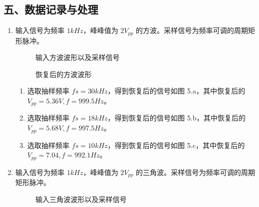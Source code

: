 \documentclass[dvipsnames, svgnames,a4paper,11pt]{article}
\begin{document}
\subsection*{五、数据记录与处理}
  \begin{enumerate}
    \item 输入信号为频率 $1kHz$，峰峰值为 $2V_{pp}$ 的方波。采样信号为频率可调的周期矩形脉冲。
      \begin{figure}[htbp]
        \centering
        \caption{输入方波波形以及采样信号}
      \end{figure}
      \begin{figure}[htbp]
        \centering

        \caption{恢复后的方波波形}
      \end{figure}
      
      \begin{enumerate}
        \item 选取抽样频率 $fs = 30kHz$，得到恢复后的信号如图 5.a，其中恢复后的 $V_{pp} = 5.36V,f = 999.5Hz$。
        \item 选取抽样频率 $fs = 18kHz$，得到恢复后的信号如图 5.b，其中恢复后的 $V_{pp} = 5.68V,f = 997.5Hz$。
        \item 选取抽样频率 $fs = 10kHz$，得到恢复后的信号如图 5.c，其中恢复后的 $V_{pp} = 7.04,f = 992.1Hz$。
      \end{enumerate}


    \newpage
    \item 输入信号为频率 $1kHz$，峰峰值为 $2V_{pp}$ 的三角波。采样信号为频率可调的周期矩形脉冲。
      \begin{figure}[htbp]
        \centering
        \caption{输入三角波波形以及采样信号}
      \end{figure}
      \begin{figure}[htbp]
        \centering


\end{figure}
\end{enumerate}
\end{document}
